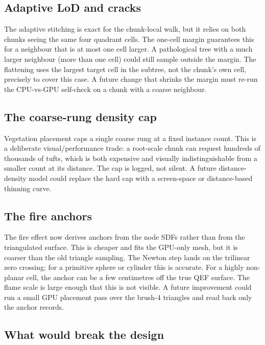 \subsection{Adaptive LoD and cracks}

The adaptive stitching is exact for the chunk-local walk, but it relies on
both chunks seeing the same four quadrant cells.  The one-cell margin
guarantees this for a neighbour that is at most one cell larger.  A
pathological tree with a much larger neighbour (more than one cell) could
still sample outside the margin.  The flattening uses the largest target
cell in the subtree, not the chunk's own cell, precisely to cover this
case.  A future change that shrinks the margin must re-run the
CPU-vs-GPU self-check on a chunk with a coarse neighbour.

\subsection{The coarse-rung density cap}

Vegetation placement caps a single coarse rung at a fixed instance count.
This is a deliberate visual/performance trade: a root-scale chunk can
request hundreds of thousands of tufts, which is both expensive and
visually indistinguishable from a smaller count at its distance.  The cap
is logged, not silent.  A future distance-density model could replace the
hard cap with a screen-space or distance-based thinning curve.

\subsection{The fire anchors}

The fire effect now derives anchors from the node SDFs rather than from the
triangulated surface.  This is cheaper and fits the GPU-only mesh, but it
is coarser than the old triangle sampling.  The Newton step lands on the
trilinear zero crossing; for a primitive sphere or cylinder this is
accurate.  For a highly non-planar cell, the anchor can be a few
centimetres off the true QEF surface.  The flame scale is large enough
that this is not visible.  A future improvement could run a small GPU
placement pass over the brush-4 triangles and read back only the anchor
records.

\subsection{What would break the design}

